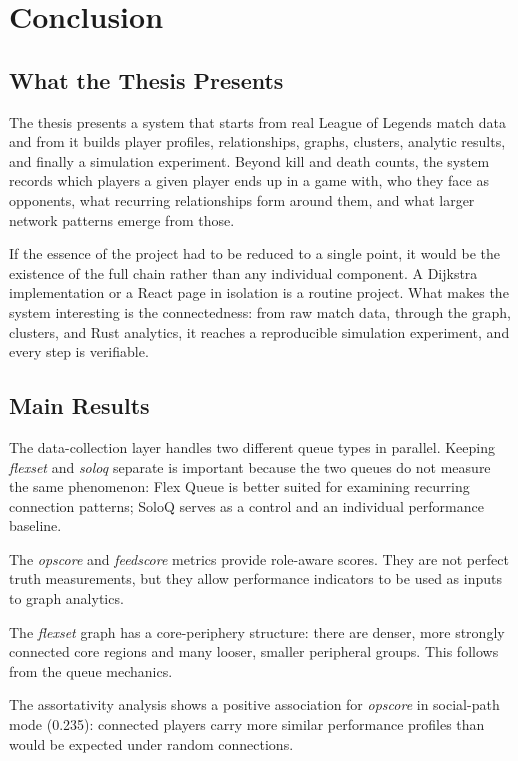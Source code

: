 \chapter{Conclusion}

\section{What the Thesis Presents}

The thesis presents a system that starts from real League of Legends match data and from it builds player profiles, relationships, graphs, clusters, analytic results, and finally a simulation experiment. Beyond kill and death counts, the system records which players a given player ends up in a game with, who they face as opponents, what recurring relationships form around them, and what larger network patterns emerge from those.

If the essence of the project had to be reduced to a single point, it would be the existence of the full chain rather than any individual component. A Dijkstra implementation or a React page in isolation is a routine project. What makes the system interesting is the connectedness: from raw match data, through the graph, clusters, and Rust analytics, it reaches a reproducible simulation experiment, and every step is verifiable.

\section{Main Results}

The data-collection layer handles two different queue types in parallel. Keeping \textit{flexset} and \textit{soloq} separate is important because the two queues do not measure the same phenomenon: Flex Queue is better suited for examining recurring connection patterns; SoloQ serves as a control and an individual performance baseline.

The \textit{opscore} and \textit{feedscore} metrics provide role-aware scores. They are not perfect truth measurements, but they allow performance indicators to be used as inputs to graph analytics.

The \textit{flexset} graph has a core-periphery structure: there are denser, more strongly connected core regions and many looser, smaller peripheral groups. This follows from the queue mechanics.

The assortativity analysis shows a positive association for \textit{opscore} in social-path mode (0.235): connected players carry more similar performance profiles than would be expected under random connections.

